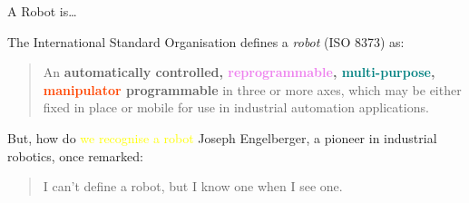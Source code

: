 \documentclass[color=pdftex,usenames,dvipsnames, aspectratio=169]{beamer}
\begin{document}
\begin{frame}{A Robot is\ldots}
\begin{block}{The International Standard Organisation defines a \emph{robot} (ISO 8373) as:
}

\begin{quote}
    An \textbf{\textcolor{OliveGreen}{automatically controlled}, \textcolor{violet}{reprogrammable}, \textcolor{teal}{multi-purpose}, \textcolor{OrangeRed}{manipulator} \textcolor{OliveGreen}{programmable}} in three or more axes, which may be either fixed in place or mobile for use in industrial automation applications.
\end{quote}
\end{block}

\begin{block}{But, how do \textcolor{yellow}{we recognise a robot}}
    Joseph Engelberger, a pioneer in industrial robotics, once remarked:
\begin{quote}
    \textcolor{RedOrange}{I can't define a robot, but I know one when I see one.}
\end{quote}
\end{block}
\end{frame}
\end{document}

